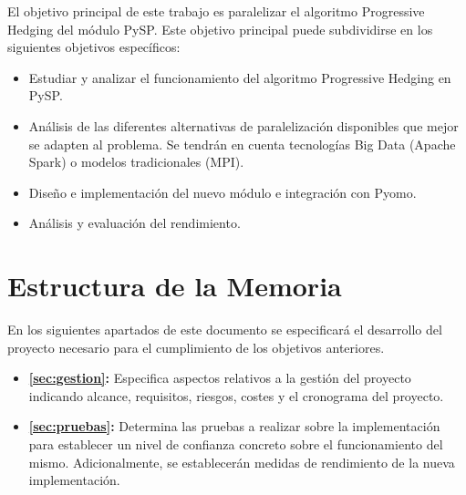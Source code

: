 
El objetivo principal de este trabajo es paralelizar el algoritmo Progressive Hedging del módulo PySP. Este objetivo principal puede subdividirse en los siguientes objetivos específicos:

\begin{itemize}
    \item Estudiar y analizar el funcionamiento del algoritmo Progressive Hedging en PySP.
    \item Análisis de las diferentes alternativas de paralelización disponibles que mejor se adapten al problema. Se tendrán en cuenta tecnologías Big Data (Apache Spark) o modelos tradicionales (MPI).
    \item Diseño e implementación del nuevo módulo e integración con Pyomo.
    \item Análisis y evaluación del rendimiento.
\end{itemize}

\section{Estructura de la Memoria}


En los siguientes apartados de este documento se especificará el desarrollo del proyecto necesario para el cumplimiento de los objetivos anteriores.

\begin{itemize}
    \item \textbf{\autoref{sec:gestion}: } Especifica aspectos relativos a la gestión del proyecto indicando alcance, requisitos, riesgos, costes y el cronograma del proyecto.
    \item \textbf{\autoref{sec:pruebas}: } Determina las pruebas a realizar sobre la implementación para establecer un nivel de confianza concreto sobre el funcionamiento del mismo. Adicionalmente, se establecerán medidas de rendimiento de la nueva implementación.
\end{itemize}